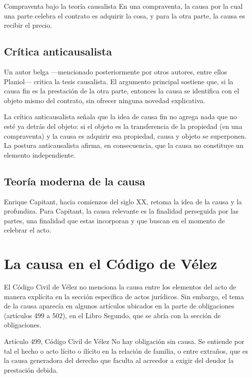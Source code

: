 \documentclass[12pt,oneside]{book}
\begin{document}
\begin{example}{Compraventa bajo la teoría causalista}
En una compraventa, la causa por la cual una parte celebra el contrato es adquirir la cosa, y para la otra parte, la causa es recibir el precio.
\end{example}

\subsection{Crítica anticausalista}

Un autor belga —mencionado posteriormente por otros autores, entre ellos Planiol— critica la tesis causalista. El argumento principal sostiene que, si la causa fin es la prestación de la otra parte, entonces la causa se identifica con el objeto mismo del contrato, sin ofrecer ninguna novedad explicativa.

La crítica anticausalista señala que la idea de causa fin no agrega nada que no esté ya detrás del objeto: si el objeto es la transferencia de la propiedad (en una compraventa) y la causa es adquirir esa propiedad, causa y objeto se superponen. La postura anticausalista afirma, en consecuencia, que la causa no constituye un elemento independiente.

\subsection{Teoría moderna de la causa}

Enrique Capitant, hacia comienzos del siglo XX, retoma la idea de la causa y la profundiza. Para Capitant, la causa relevante es la finalidad perseguida por las partes, una finalidad que estas incorporan y que buscan en el momento de celebrar el acto.

\section{La causa en el Código de Vélez}

El Código Civil de Vélez no menciona la causa entre los elementos del acto de manera explícita en la sección específica de actos jurídicos. Sin embargo, el tema de la causa aparecía en algunos artículos ubicados en la parte de obligaciones (artículos 499 a 502), en el Libro Segundo, que se abría con la sección de obligaciones.

\begin{definition}{Artículo 499, Código Civil de Vélez}
No hay obligación sin causa. Se entiende por tal el hecho o acto lícito o ilícito en la relación de familia, o entre extraños, que es la causa generadora del derecho que faculta al acreedor a exigir del deudor la prestación debida.
\end{definition}
\end{document}
